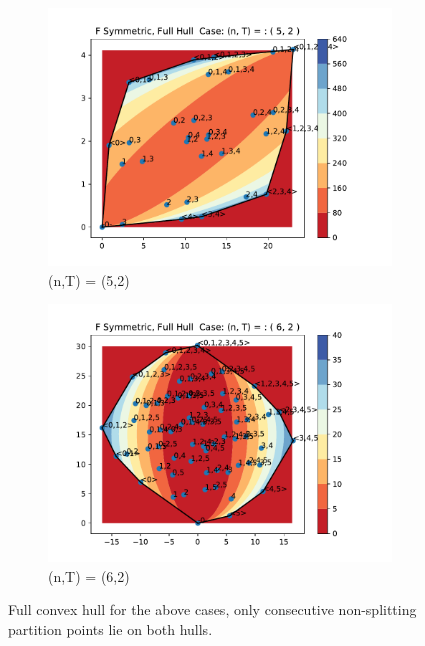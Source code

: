 \documentclass{article}
\theoremstyle{case}
\begin{document}
\vspace{6pt}
\begin{figure}
\centering
\begin{subfigure}{.5\textwidth}
  \centering
  \includegraphics[scale=.55]{full_hull_5_2.pdf}
  \caption{(n,T) = (5,2)}
  \label{fig:sub1}
\end{subfigure}%
\begin{subfigure}{.5\textwidth}
  \centering
  \includegraphics[scale=.55]{full_hull_6_2.pdf}
  \caption{(n,T) = (6,2)}
  \label{fig:sub2}
\end{subfigure}
\caption{Full convex hull for the above cases, only consecutive non-splitting partition points lie on both hulls.}
\label{fig:test}
\end{figure}
\end{document}
